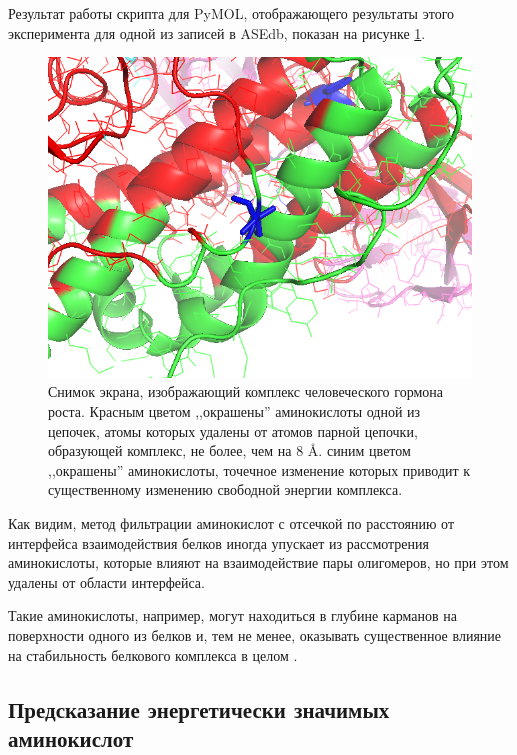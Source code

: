 Результат работы скрипта для PyMOL, отображающего результаты этого эксперимента для одной из записей в ASEdb, показан на  рисунке \ref{fig:image7}.


\begin{figure}
\includegraphics[width=\linewidth]{image7.png}

\caption{\small{Снимок экрана, изображающий комплекс человеческого гормона роста. Красным цветом ,,окрашены'' аминокислоты одной из цепочек, атомы которых удалены от атомов парной цепочки, образующей  комплекс, не более, чем на 8 \AA{}. синим цветом ,,окрашены'' аминокислоты, точечное изменение которых приводит к существенному изменению свободной энергии комплекса.  }}
\label{fig:image7}
\end{figure}

Как видим, метод фильтрации аминокислот с отсечкой по расстоянию от интерфейса взаимодействия белков иногда упускает из рассмотрения аминокислоты, которые влияют на взаимодействие пары олигомеров, но при этом удалены от области интерфейса.

Такие аминокислоты, например, могут находиться в глубине карманов на поверхности одного из белков и, тем не менее, оказывать существенное влияние на стабильность белкового комплекса в целом \cite{pockets2004}.

\newpage
\subsection{Предсказание энергетически значимых аминокислот}

